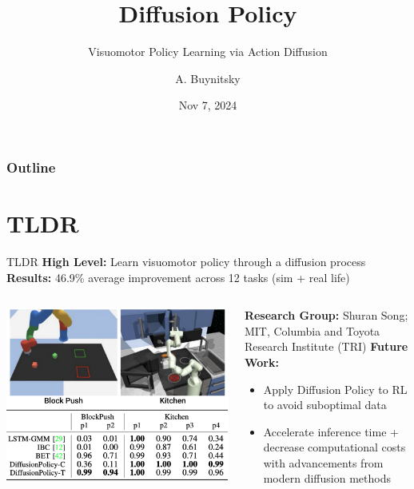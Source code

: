 \documentclass{beamer}
\title[Diffusion Policy]{Diffusion Policy}
\subtitle{Visuomotor Policy Learning via Action Diffusion} %
\author[MLP]{A. Buynitsky}
\date{Nov 7, 2024}
\begin{document}
\frame{\titlepage}


\begin{frame}
\frametitle{Outline}
\tableofcontents
\end{frame}
\section{TLDR}
\begin{frame}[t]{TLDR}
    \textbf{High Level:} Learn visuomotor policy through a diffusion process \newline
    \textbf{Results:} 46.9\% average improvement across 12 tasks (sim + real life)
    \begin{columns}
		\begin{column}{.5\textwidth}
			\begin{center}
				\includegraphics[width=\textwidth]{./img/dp_results.png}
			\end{center} \pause
		\end{column}
		\hspace{1em}
		\begin{column}{.5\textwidth}
            \textbf{Research Group:} Shuran Song; MIT, Columbia and Toyota Research Institute (TRI)\newline \pause
            \textbf{Future Work:}
            \begin{itemize}[label=-]
                \item Apply Diffusion Policy to RL to avoid suboptimal data
                \item Accelerate inference time + decrease computational costs with advancements from modern diffusion methods
            \end{itemize}
		\end{column}
	\end{columns}
\end{frame}
\end{document}
